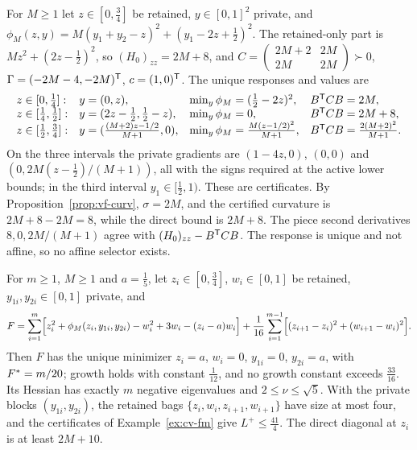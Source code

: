 \begin{example}\label{ex:cv-fm}
For $M\ge1$ let $z\in[0,\frac34]$ be retained, $y\in[0,1]^2$ private, and
$\phi_M(z,y)=M(y_1+y_2-z)^2+(y_1-2z+\frac12)^2$. The retained-only part is
$Mz^2+(2z-\frac12)^2$, so $(H_0)_{zz}=2M+8$, and
$C=\left(\begin{smallmatrix}2M+2&2M\\2M&2M\end{smallmatrix}\right)\succ0$,
$\Gamma=(-2M-4,-2M)^{\mathsf T}$, $c=(1,0)^{\mathsf T}$. The unique responses and values
are
\[
\begin{array}{llll}
z\in[0,\tfrac14]:& y=(0,z),& \min_y\phi_M=(\tfrac12-2z)^2,& B^{\mathsf T}CB=2M,\\
z\in[\tfrac14,\tfrac12]:& y=(2z-\tfrac12,\tfrac12-z),& \min_y\phi_M=0,& B^{\mathsf T}CB=2M+8,\\
z\in[\tfrac12,\tfrac34]:& y=(\tfrac{(M+2)z-1/2}{M+1},0),& \min_y\phi_M=\tfrac{M(z-1/2)^2}{M+1},
& B^{\mathsf T}CB=\tfrac{2(M+2)^2}{M+1}.
\end{array}
\]
On the three intervals the private gradients are $(1-4z,0)$, $(0,0)$ and
$(0,2M(z-\frac12)/(M+1))$, all with the signs required at the active lower
bounds; in the third interval $y_1\in[\frac12,1)$. These are certificates.
By Proposition~\ref{prop:vf-curv}, $\sigma=2M$, and the certified curvature
is $2M+8-2M=8$, while the direct bound is $2M+8$. The piece second
derivatives $8,0,2M/(M+1)$ agree with $(H_0)_{zz}-B^{\mathsf T}CB$. The response is
unique and not affine, so no affine selector exists.
\end{example}

\begin{proposition}\label{prop:cv-ladder}
For $m\ge1$, $M\ge1$ and $a=\frac15$, let $z_i\in[0,\frac34]$,
$w_i\in[0,1]$ be retained, $y_{1i},y_{2i}\in[0,1]$ private, and
\[
F=\sum_{i=1}^m\Bigl[z_i^2+\phi_M(z_i,y_{1i},y_{2i})-w_i^2+3w_i-(z_i-a)w_i\Bigr]
+\frac1{16}\sum_{i=1}^{m-1}\Bigl[(z_{i+1}-z_i)^2+(w_{i+1}-w_i)^2\Bigr].
\]
Then $F$ has the unique minimizer $z_i=a$, $w_i=0$, $y_{1i}=0$,
$y_{2i}=a$, with $F^{*}=m/20$; growth holds with constant $\frac1{12}$, and
no growth constant exceeds $\frac{33}{16}$. Its Hessian has exactly $m$
negative eigenvalues and $2\le\nu\le\sqrt5$. With the private blocks
$(y_{1i},y_{2i})$, the retained bags $\{z_i,w_i,z_{i+1},w_{i+1}\}$ have size
at most four, and the certificates of Example~\ref{ex:cv-fm} give
$L^+\le\frac{41}4$. The direct diagonal at $z_i$ is at least $2M+10$.
\end{proposition}

